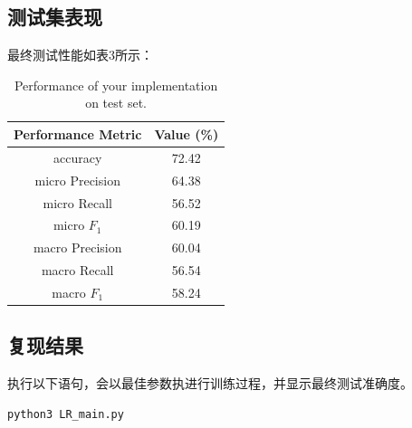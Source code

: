 \documentclass{article}
\begin{document}
\subsection{测试集表现}
最终测试性能如表3所示：
\begin{table}[!htbp]
    \centering
     \caption{Performance of your implementation on test set.}
     \vspace{2mm}
    \label{tab:my_label}
    \begin{tabular}{|c|c|}
       \hline
       Performance Metric & Value (\%) \\
       \hline
       accuracy & 72.42 \\
       \hline
       micro Precision  & 64.38 \\
       \hline
       micro Recall & 56.52 \\
       \hline
       micro $F_1$ & 60.19 \\
       \hline
       macro Precision  & 60.04 \\
       \hline
       macro Recall & 56.54 \\
       \hline
       macro $F_1$ & 58.24 \\
       \hline
    \end{tabular}
\end{table}

\subsection{复现结果}
执行以下语句，会以最佳参数执进行训练过程，并显示最终测试准确度。
\begin{lstlisting}
python3 LR_main.py
\end{lstlisting}
\end{document}
